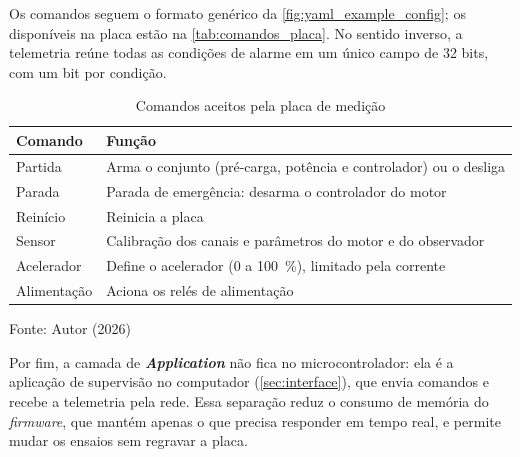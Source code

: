 Os comandos seguem o formato genérico da \autoref{fig:yaml_example_config};
os disponíveis na placa estão na \autoref{tab:comandos_placa}. No sentido
inverso, a telemetria reúne todas as condições de alarme em um único campo de
32 bits, com um bit por condição.

\begin{table}[H]
    \centering
    \caption{Comandos aceitos pela placa de medição}
    \label{tab:comandos_placa}
    \small
    \begin{tabular}{lp{10.5cm}}
        \toprule
        \textbf{Comando} & \textbf{Função} \\
        \midrule
        Partida     & Arma o conjunto (pré-carga, potência e controlador) ou o desliga \\
        Parada      & Parada de emergência: desarma o controlador do motor \\
        Reinício    & Reinicia a placa \\
        Sensor      & Calibração dos canais e parâmetros do motor e do observador \\
        Acelerador  & Define o acelerador (0 a \SI{100}{\percent}), limitado pela corrente \\
        Alimentação & Aciona os relés de alimentação \\
        \bottomrule
    \end{tabular}

    \vspace{2pt}
    {\small Fonte: Autor (2026)}
\end{table}

Por fim, a camada de \textbf{\textit{Application}} não fica no microcontrolador:
ela é a aplicação de supervisão no computador (\autoref{sec:interface}), que
envia comandos e recebe a telemetria pela rede. Essa separação reduz o
consumo de memória do \textit{firmware}, que mantém apenas o que precisa
responder em tempo real, e permite mudar os ensaios sem regravar a placa.
